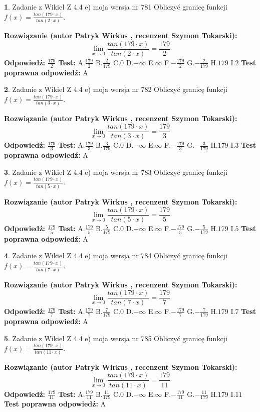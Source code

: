 \documentclass[12pt, a4paper]{article}
\theoremstyle{definition} %
\newtheorem{zad}{}
\newcommand{\zadStart}[1]{\begin{zad}#1\newline}
\newcommand{\zadStop}{\end{zad}}
\newcommand{\rozwStart}[2]{\noindent \textbf{Rozwiązanie (autor #1 , recenzent #2): }\newline}
\newcommand{\rozwStop}{\newline}
\newcommand{\odpStart}{\noindent \textbf{Odpowiedź:}\newline}
\newcommand{\odpStop}{\newline}
\newcommand{\testStart}{\noindent \textbf{Test:}\newline}
\newcommand{\testStop}{\newline}
\newcommand{\kluczStart}{\noindent \textbf{Test poprawna odpowiedź:}\newline}
\newcommand{\kluczStop}{\newline}
\begin{document}
\zadStart{Zadanie z Wikieł Z 4.4 e) moja wersja nr 781}
Obliczyć granicę funkcji $f(x)=\frac{tan(179\cdot x)}{tan(2\cdot x)}$.
\zadStop
\rozwStart{Patryk Wirkus}{Szymon Tokarski}
$$\lim\limits_{x\to 0}\frac{tan(179\cdot x)}{tan(2\cdot x)}=
\frac{179}{2}$$
\rozwStop
\odpStart
$\frac{179}{2}$
\odpStop
\testStart
A.$\frac{179}{2}$
B.$\frac{2}{179}$
C.$0$
D.$-\infty$
E.$\infty$
F.$-\frac{179}{2}$
G.$-\frac{2}{179}$
H.$179$
I.$2$
\testStop
\kluczStart
A
\kluczStop



\zadStart{Zadanie z Wikieł Z 4.4 e) moja wersja nr 782}
Obliczyć granicę funkcji $f(x)=\frac{tan(179\cdot x)}{tan(3\cdot x)}$.
\zadStop
\rozwStart{Patryk Wirkus}{Szymon Tokarski}
$$\lim\limits_{x\to 0}\frac{tan(179\cdot x)}{tan(3\cdot x)}=
\frac{179}{3}$$
\rozwStop
\odpStart
$\frac{179}{3}$
\odpStop
\testStart
A.$\frac{179}{3}$
B.$\frac{3}{179}$
C.$0$
D.$-\infty$
E.$\infty$
F.$-\frac{179}{3}$
G.$-\frac{3}{179}$
H.$179$
I.$3$
\testStop
\kluczStart
A
\kluczStop



\zadStart{Zadanie z Wikieł Z 4.4 e) moja wersja nr 783}
Obliczyć granicę funkcji $f(x)=\frac{tan(179\cdot x)}{tan(5\cdot x)}$.
\zadStop
\rozwStart{Patryk Wirkus}{Szymon Tokarski}
$$\lim\limits_{x\to 0}\frac{tan(179\cdot x)}{tan(5\cdot x)}=
\frac{179}{5}$$
\rozwStop
\odpStart
$\frac{179}{5}$
\odpStop
\testStart
A.$\frac{179}{5}$
B.$\frac{5}{179}$
C.$0$
D.$-\infty$
E.$\infty$
F.$-\frac{179}{5}$
G.$-\frac{5}{179}$
H.$179$
I.$5$
\testStop
\kluczStart
A
\kluczStop



\zadStart{Zadanie z Wikieł Z 4.4 e) moja wersja nr 784}
Obliczyć granicę funkcji $f(x)=\frac{tan(179\cdot x)}{tan(7\cdot x)}$.
\zadStop
\rozwStart{Patryk Wirkus}{Szymon Tokarski}
$$\lim\limits_{x\to 0}\frac{tan(179\cdot x)}{tan(7\cdot x)}=
\frac{179}{7}$$
\rozwStop
\odpStart
$\frac{179}{7}$
\odpStop
\testStart
A.$\frac{179}{7}$
B.$\frac{7}{179}$
C.$0$
D.$-\infty$
E.$\infty$
F.$-\frac{179}{7}$
G.$-\frac{7}{179}$
H.$179$
I.$7$
\testStop
\kluczStart
A
\kluczStop



\zadStart{Zadanie z Wikieł Z 4.4 e) moja wersja nr 785}
Obliczyć granicę funkcji $f(x)=\frac{tan(179\cdot x)}{tan(11\cdot x)}$.
\zadStop
\rozwStart{Patryk Wirkus}{Szymon Tokarski}
$$\lim\limits_{x\to 0}\frac{tan(179\cdot x)}{tan(11\cdot x)}=
\frac{179}{11}$$
\rozwStop
\odpStart
$\frac{179}{11}$
\odpStop
\testStart
A.$\frac{179}{11}$
B.$\frac{11}{179}$
C.$0$
D.$-\infty$
E.$\infty$
F.$-\frac{179}{11}$
G.$-\frac{11}{179}$
H.$179$
I.$11$
\testStop
\kluczStart
A
\kluczStop
\end{document}
